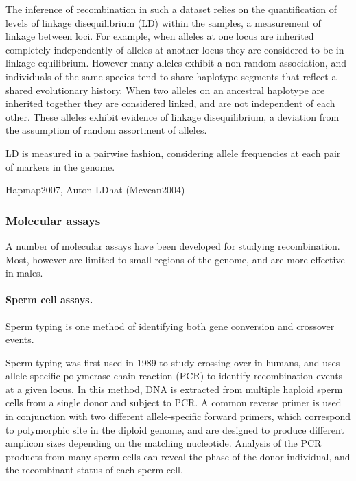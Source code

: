 The inference of recombination in such a dataset relies on the quantification of levels of linkage disequilibrium (LD) within the samples, a measurement of linkage between loci.
For example, when alleles at one locus are inherited completely independently of alleles at another locus they are considered to be in linkage equilibrium.
However many alleles exhibit a non-random association, and individuals of the same species tend to share haplotype segments that reflect a shared evolutionary history.
When two alleles on an ancestral haplotype are inherited together they are considered linked, and are not independent of each other.
These alleles exhibit evidence of linkage disequilibrium, a deviation from the assumption of random assortment of alleles.

LD is measured in a pairwise fashion, considering allele frequencies at each pair of markers in the genome.


Hapmap2007, Auton LDhat (Mcvean2004)


\subsubsection{Molecular assays}

A number of molecular assays have been developed for studying recombination.
Most, however are limited to small regions of the genome, and are more effective in males.

\paragraph{Sperm cell assays.}

Sperm typing is one method of identifying both gene conversion and crossover events.

Sperm typing was first used in 1989 to study crossing over in humans\cite{Cui1989}, and uses
allele-specific polymerase chain reaction (PCR) to identify recombination events at a given locus.
In this method, DNA is extracted from multiple haploid sperm cells from a single donor and subject to PCR.
A common reverse primer is used in conjunction with two different allele-specific forward primers, which correspond to polymorphic site in the diploid genome, and are designed to produce different amplicon sizes depending on the matching nucleotide.
Analysis of the PCR products from many sperm cells can reveal the phase of the donor individual, and the recombinant status of each sperm cell.

